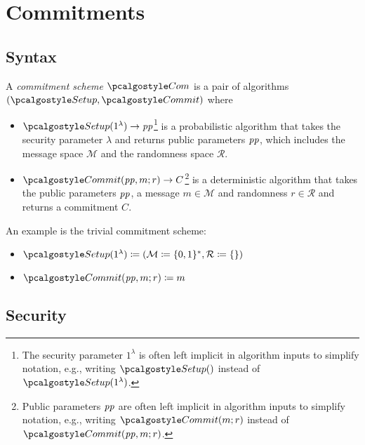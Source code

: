 \section{Commitments}\label{sec:commitments}

\subsection{Syntax}
\begin{definition}
  A \emph{commitment scheme} $\algo{Com}$ is a pair of \ppt algorithms $(\algo{Setup}, \algo{Commit})$ where
  \begin{itemize}
    \item $\algo{Setup}(1^\lambda) \rightarrow \params$\footnote{The security parameter $1^\lambda$ is often left implicit in algorithm inputs to simplify notation, e.g., writing $\algo{Setup}()$ instead of $\algo{Setup}(1^\lambda)$.} is a probabilistic algorithm that takes the security parameter $\lambda$ and returns public parameters $\mathit{pp}$, which includes the message space $\mathcal{M}$ and the randomness space $\mathcal{R}$.
    \item $\algo{Commit}(\params, m; r) \rightarrow C$\footnote{Public parameters $\mathit{pp}$ are often left implicit in algorithm inputs to simplify notation, e.g., writing $\algo{Commit}(m; r)$ instead of $\algo{Commit}(\params, m; r)$.} is a deterministic algorithm that takes the public parameters $\mathit{pp}$, a message $m \in \mathcal{M}$ and randomness $r \in \mathcal{R}$ and returns a commitment $C$.
  \end{itemize}
\end{definition}

\begin{example}
  An example is the trivial commitment scheme\label{sec:trivial-com}:
  \begin{itemize}
    \item $\algo{Setup}(1^\lambda) \defeq (\mathcal{M} \defeq \{0, 1\}^*, \mathcal{R} \defeq \{\})$
    \item $\algo{Commit}(\params,m;r) \defeq m$
  \end{itemize}
\end{example}

\subsection{Security}

